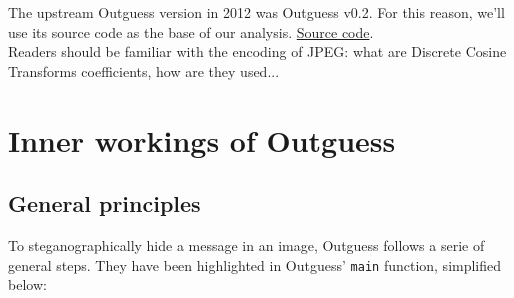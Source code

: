 \documentclass{article}
\begin{document}
The upstream Outguess version in 2012 was Outguess v0.2. For this reason, we'll use its source code as the base of our analysis. \href{https://fossies.org/linux/privat/old/outguess-0.2.tar.gz/}{Source code}. \\

Readers should be familiar with the encoding of JPEG: what are Discrete Cosine Transforms coefficients, how are they used...

\section{Inner workings of Outguess}

\subsection{General principles}

To steganographically hide a message in an image, Outguess follows a serie of general steps. They have been highlighted in Outguess' \texttt{main} function, simplified below:
\end{document}

